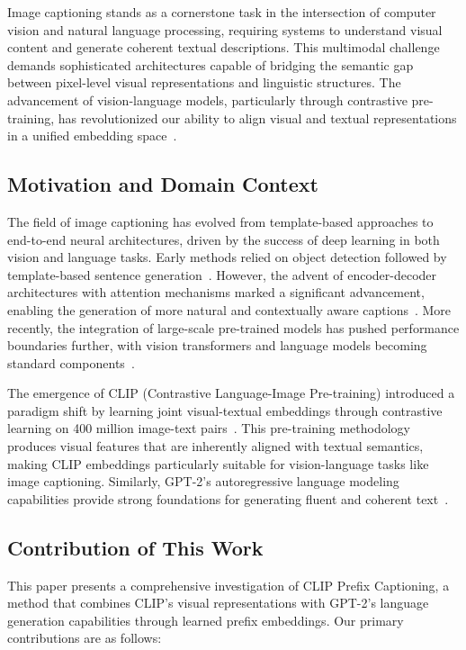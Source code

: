 \documentclass[runningheads]{llncs}
\begin{document}
Image captioning stands as a cornerstone task in the intersection of computer vision and natural language processing, requiring systems to understand visual content and generate coherent textual descriptions. This multimodal challenge demands sophisticated architectures capable of bridging the semantic gap between pixel-level visual representations and linguistic structures. The advancement of vision-language models, particularly through contrastive pre-training, has revolutionized our ability to align visual and textual representations in a unified embedding space~\cite{radford2021learning}.

\subsection{Motivation and Domain Context}

The field of image captioning has evolved from template-based approaches to end-to-end neural architectures, driven by the success of deep learning in both vision and language tasks. Early methods relied on object detection followed by template-based sentence generation~\cite{kulkarni2011baby}. However, the advent of encoder-decoder architectures with attention mechanisms marked a significant advancement, enabling the generation of more natural and contextually aware captions~\cite{xu2015show}. More recently, the integration of large-scale pre-trained models has pushed performance boundaries further, with vision transformers and language models becoming standard components~\cite{li2022blip}.

The emergence of CLIP (Contrastive Language-Image Pre-training) introduced a paradigm shift by learning joint visual-textual embeddings through contrastive learning on 400 million image-text pairs~\cite{radford2021learning}. This pre-training methodology produces visual features that are inherently aligned with textual semantics, making CLIP embeddings particularly suitable for vision-language tasks like image captioning. Similarly, GPT-2's autoregressive language modeling capabilities provide strong foundations for generating fluent and coherent text~\cite{radford2019language}.

\subsection{Contribution of This Work}

This paper presents a comprehensive investigation of CLIP Prefix Captioning, a method that combines CLIP's visual representations with GPT-2's language generation capabilities through learned prefix embeddings. Our primary contributions are as follows:
\end{document}
